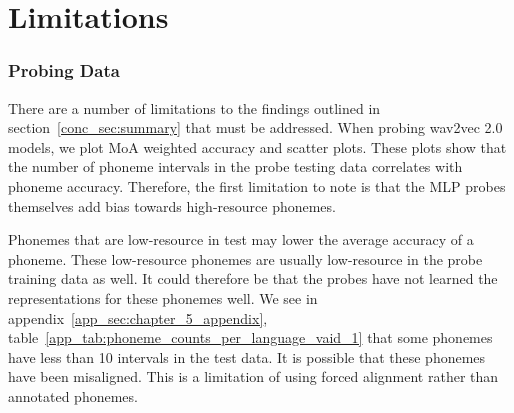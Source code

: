 



\section{Limitations}\label{conc_sec:limitations}

\subsubsection{Probing Data}
There are a number of limitations to the findings outlined in section~\ref{conc_sec:summary} that must be addressed. When probing wav2vec 2.0 models, we plot MoA weighted accuracy and scatter plots. These plots show that the number of phoneme intervals in the probe testing data correlates with phoneme accuracy. Therefore, the first limitation to note is that the MLP probes themselves add bias towards high-resource phonemes. 

Phonemes that are low-resource in test may lower the average accuracy of a phoneme. These low-resource phonemes are usually low-resource in the probe training data as well. It could therefore be that the probes have not learned the representations for these phonemes well. We see in appendix~\ref{app_sec:chapter_5_appendix}, table~\ref{app_tab:phoneme_counts_per_language_vaid_1} that some phonemes have less than 10 intervals in the test data. It is possible that these phonemes have been misaligned. This is a limitation of using forced alignment rather than annotated phonemes. 

